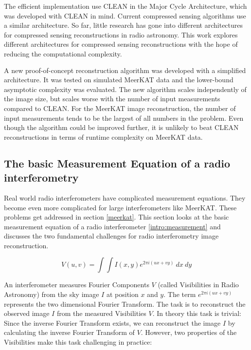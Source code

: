 The efficient implementation use CLEAN in the Major Cycle Architecture, which was developed with CLEAN in mind. Current compressed sensing algorithms use a similar architecture. So far, little research has gone into different architectures for compressed sensing reconstructions in radio astronomy. This work explores different architectures for compressed sensing reconstructions with the hope of reducing the computational complexity. 

A new proof-of-concept reconstruction algorithm was developed with a simplified architecture. It was tested on simulated MeerKAT data and the lower-bound asymptotic complexity was evaluated. The new algorithm scales independently of the image size, but scales worse with the number of input measurements compared to CLEAN. For the MeerKAT image reconstruction, the number of input measurements tends to be the largest of all numbers in the problem. Even though the algorithm could be improved further, it is unlikely to beat CLEAN reconstructions in terms of runtime complexity on MeerKAT data.

\subsection{The basic Measurement Equation of a radio interferometry}\label{intro:basic}
Real world radio interferometers have complicated measurement equations. They become even more complicated for large interferometers like MeerKAT. These problems get addressed in section \ref{meerkat}. This section looks at the basic measurement equation of a radio interferometer \eqref{intro:measurement} and discusses the two fundamental challenges for radio interferometry image reconstruction. 

\begin{equation}\label{intro:measurement}
V(u, v) = \int\int I(x, y) e^{2 \pi i (ux+vy)} \: dx \: dy
\end{equation}

An interferometer measures Fourier Components $V$ (called Visibilities in Radio Astronomy) from the sky image $I$ at position $x$ and $y$. The term $e^{2 \pi i (ux+vy)}$ represents the two dimensional Fourier Transform. The task is to reconstruct the observed image $I$ from the measured Visibilities $V$. In theory this task is trivial: Since the inverse Fourier Transform exists, we can reconstruct the image $I$ by calculating the inverse Fourier Transform of $V$. However, two properties of the Visibilities make this task challenging in practice:

